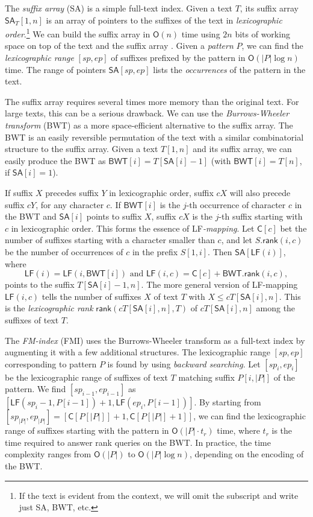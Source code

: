 \documentclass[smallabstract,smallcaptions]{dccpaper}
\newcommand{\abs}[1]{\ensuremath{\lvert #1 \rvert}}
\newcommand{\Oh}{\ensuremath{\mathsf{O}}}
\newcommand{\SA}{\textsf{SA}}
\newcommand{\BWT}{\textsf{BWT}}
\newcommand{\FMI}{\textsf{FMI}}
\newcommand{\mSA}{\ensuremath{\mathsf{SA}}}
\newcommand{\mBWT}{\ensuremath{\mathsf{BWT}}}
\newcommand{\mC}{\ensuremath{\mathsf{C}}}
\newcommand{\LF}{\textsf{LF}}
\newcommand{\rank}{\textsf{rank}}
\newcommand{\mLF}{\ensuremath{\mathsf{LF}}}
\newcommand{\mrank}{\ensuremath{\mathsf{rank}}}
\begin{document}
The \emph{suffix array} (\SA) \cite{Manber1993} is a simple full-text index. Given a text $T$, its suffix array $\mSA_{T}[1,n]$ is an array of pointers to the suffixes of the text in \emph{lexicographic order}.\footnote{If the text is evident from the context, we will omit the subscript and write just \SA{}, \BWT{}, etc.} We can build the suffix array in $\Oh(n)$ time using $2n$ bits of working space on top of the text and the suffix array \cite{Nong2011}. Given a \emph{pattern} $P$, we can find the \emph{lexicographic range} $[sp,ep]$ of suffixes prefixed by the pattern in $\Oh(\abs{P} \log n)$ time. The range of pointers $\mSA[sp,ep]$ lists the \emph{occurrences} of the pattern in the text.

The suffix array requires several times more memory than the original text. For large texts, this can be a serious drawback. We can use the \emph{Burrows-Wheeler transform} (\BWT) \cite{Burrows1994} as a more space-efficient alternative to the suffix array. The \BWT{} is an easily reversible permutation of the text with a similar combinatorial structure to the suffix array. Given a text $T[1,n]$ and its suffix array, we can easily produce the \BWT{} as $\mBWT[i] = T[\mSA[i]-1]$ (with $\mBWT[i] = T[n]$, if $\mSA[i] = 1$).

If suffix $X$ precedes suffix $Y$ in lexicographic order, suffix $cX$ will also precede suffix $cY$, for any character $c$. If $\mBWT[i]$ is the $j$\nobreakdash-th occurrence of character $c$ in the \BWT{} and $\mSA[i]$ points to suffix $X$, suffix $cX$ is the $j$\nobreakdash-th suffix starting with $c$ in lexicographic order. This forms the essence of \LF\emph{\nobreakdash-mapping}. Let $\mC[c]$ bet the number of suffixes starting with a character smaller than $c$, and let $S.\mrank(i,c)$ be the number of occurrences of $c$ in the prefix $S[1,i]$. Then $\mSA[\mLF(i)]$, where
$$
\mLF(i) = \mLF(i,\mBWT[i])
\,\, \textrm{and} \,\,
\mLF(i,c) = \mC[c] + \mBWT.\mrank(i, c),
$$
points to the suffix $T[\mSA[i]-1,n]$. The more general version of \LF-mapping $\mLF(i,c)$ tells the number of suffixes $X$ of text $T$ with $X \le c T[\mSA[i],n]$. This is the \emph{lexicographic rank} $\mrank(cT[\mSA[i],n], T)$ of $cT[\mSA[i],n]$ among the suffixes of text $T$.

The \emph{FM-index} (\FMI) \cite{Ferragina2005a} uses the Burrows-Wheeler transform as a full-text index by augmenting it with a few additional structures. The lexicographic range $[sp,ep]$ corresponding to pattern $P$ is found by using \emph{backward searching}. Let $[sp_{i},ep_{i}]$ be the lexicographic range of suffixes of text $T$ matching suffix $P[i, \abs{P}]$ of the pattern. We find $[sp_{i-1},ep_{i-1}]$ as $[\mLF(sp_{i}-1, P[i-1]) + 1, \mLF(ep_{i}, P[i-1])]$. By starting from $[sp_{\abs{P}}, ep_{\abs{P}}] = [\mC[P[\abs{P}]]+1, \mC[P[\abs{P}]+1]]$, we can find the lexicographic range of suffixes starting with the pattern in $\Oh(\abs{P} \cdot t_{r})$ time, where $t_{r}$ is the time required to answer \rank{} queries on the \BWT. In practice, the time complexity ranges from $\Oh(\abs{P})$ to $\Oh(\abs{P} \log n)$, depending on the encoding of the \BWT{}.
\end{document}
